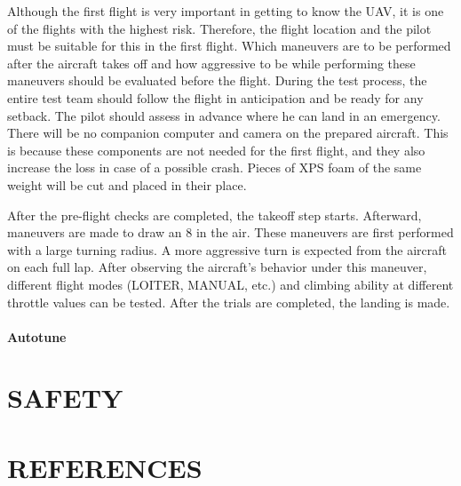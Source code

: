 \documentclass[12pt]{article}
\begin{document}
Although the first flight is very important in getting to know the UAV, it is one of the flights with the highest risk. Therefore, the flight location and the pilot must be suitable for this in the first flight. Which maneuvers are to be performed after the aircraft takes off and how aggressive to be while performing these maneuvers should be evaluated before the flight. During the test process, the entire test team should follow the flight in anticipation and be ready for any setback. The pilot should assess in advance where he can land in an emergency. \\


There will be no companion computer and camera on the prepared aircraft. This is because these components are not needed for the first flight, and they also increase the loss in case of a possible crash. Pieces of XPS foam of the same weight will be cut and placed in their place.

After the pre-flight checks are completed, the takeoff step starts. Afterward, maneuvers are made to draw an 8 in the air. These maneuvers are first performed with a large turning radius. A more aggressive turn is expected from the aircraft on each full lap. After observing the aircraft's behavior under this maneuver, different flight modes (LOITER, MANUAL, etc.) and climbing ability at different throttle values can be tested. After the trials are completed, the landing is made.

\paragraph*{Autotune} 


\section{SAFETY}

\section{REFERENCES}

\singlespacing
 

\end{document}

